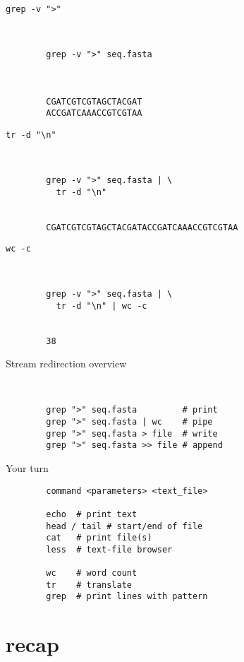 \documentclass[xcolor=dvipsnames]{beamer}
\begin{document}
\begin{frame}[fragile]
	\huge
	\verb!grep -v ">"!
	\Large
	\begin{verbatim}


		grep -v ">" seq.fasta



		CGATCGTCGTAGCTACGAT
		ACCGATCAAACCGTCGTAA
	\end{verbatim}
\end{frame}

\begin{frame}[fragile]
	\huge
	\verb!tr -d "\n"!
	\Large
	\begin{verbatim}


		grep -v ">" seq.fasta | \
		  tr -d "\n"


		CGATCGTCGTAGCTACGATACCGATCAAACCGTCGTAA
	\end{verbatim}
\end{frame}

\begin{frame}[fragile]
	\huge
	\verb!wc -c!
	\Large
	\begin{verbatim}


		grep -v ">" seq.fasta | \
		  tr -d "\n" | wc -c


		38
	\end{verbatim}
\end{frame}

\begin{frame}[fragile]
	\huge
	Stream redirection overview
	\Large
	\begin{verbatim}


		grep ">" seq.fasta         # print
		grep ">" seq.fasta | wc    # pipe
		grep ">" seq.fasta > file  # write
		grep ">" seq.fasta >> file # append
	\end{verbatim}
\end{frame}

\begin{frame}[fragile]
	\huge
	Your turn
	\Large
	\begin{verbatim}
		command <parameters> <text_file>

		echo  # print text
		head / tail # start/end of file
		cat   # print file(s)
		less  # text-file browser

		wc    # word count
		tr    # translate
		grep  # print lines with pattern
	\end{verbatim}
\end{frame}

\section{recap}
\end{document}
